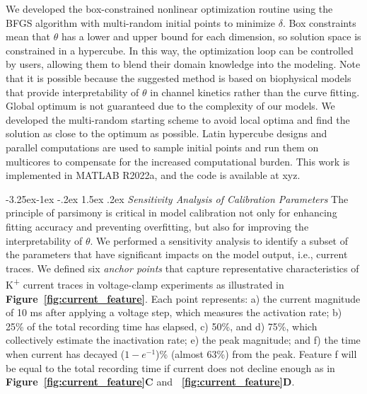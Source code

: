 \documentclass[11pt]{article}
\makeatletter
\renewcommand\subsection{\@startsection{subsection}{2}{\z@}%
                                     {-3.25ex\@plus -1ex \@minus -.2ex}%
                                     {1.5ex \@plus .2ex}%
                                     {\normalfont\fontfamily{phv}\fontsize{14}{17}\bfseries}}
\makeatother
\begin{document}
We developed the box-constrained nonlinear optimization routine using the BFGS algorithm with multi-random initial points to minimize $\delta$. Box constraints mean that $\theta$ has a lower and upper bound for each dimension, so solution space is constrained in a hypercube. In this way, the optimization loop can be controlled by users, allowing them to blend their domain knowledge into the modeling. Note that it is possible because the suggested method is based on biophysical models that provide interpretability of $\theta$ in channel kinetics rather than the curve fitting. Global optimum is not guaranteed due to the complexity of our models. We developed the multi-random starting scheme to avoid local optima and find the solution as close to the optimum as possible. Latin hypercube designs and parallel computations are used to sample initial points and run them on multicores to compensate for the increased computational burden. This work is implemented in MATLAB R2022a, and the code is available at xyz.

\subsection{\emph{Sensitivity Analysis of Calibration Parameters}} \label{s:methods.3}
The principle of parsimony is critical in model calibration not only for enhancing fitting accuracy and preventing overfitting, but also for improving the interpretability of $\theta$. We performed a sensitivity analysis to identify a subset of the parameters that have significant impacts on the model output, i.e., current traces. We defined six \textit{anchor points} that capture representative characteristics of K\textsuperscript{+} current traces in voltage-clamp experiments as illustrated in \textbf{Figure~\ref{fig:current_feature}}. Each point represents: a) the current magnitude of 10 ms after applying a voltage step, which measures the activation rate; b) 25\% of the total recording time has elapsed, c) 50\%, and d) 75\%, which collectively estimate the inactivation rate; e) the peak magnitude; and f) the time when current has decayed ($1-e^{-1}$)\% (almost 63\%) from the peak. Feature f will be equal to the total recording time if current does not decline enough as in \textbf{Figure~\ref{fig:current_feature}C} and \textbf{~\ref{fig:current_feature}D}. 
\end{document}
